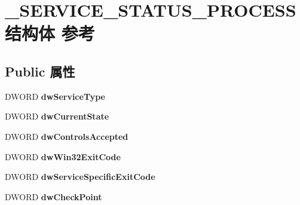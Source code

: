 \hypertarget{struct___s_e_r_v_i_c_e___s_t_a_t_u_s___p_r_o_c_e_s_s}{}\section{\+\_\+\+S\+E\+R\+V\+I\+C\+E\+\_\+\+S\+T\+A\+T\+U\+S\+\_\+\+P\+R\+O\+C\+E\+S\+S结构体 参考}
\label{struct___s_e_r_v_i_c_e___s_t_a_t_u_s___p_r_o_c_e_s_s}
\subsection*{Public 属性}
\begin{DoxyCompactItemize}
\item 
\mbox{\label{struct___s_e_r_v_i_c_e___s_t_a_t_u_s___p_r_o_c_e_s_s_a4f7622b652561e6fab563b5cab7ea99b}} 
D\+W\+O\+RD {\bfseries dw\+Service\+Type}
\item 
\mbox{\label{struct___s_e_r_v_i_c_e___s_t_a_t_u_s___p_r_o_c_e_s_s_aad5734dd9b87043e4e08a543c2dc3015}} 
D\+W\+O\+RD {\bfseries dw\+Current\+State}
\item 
\mbox{\label{struct___s_e_r_v_i_c_e___s_t_a_t_u_s___p_r_o_c_e_s_s_ac13b0a834f89f1159f95b05c8e6c1b2b}} 
D\+W\+O\+RD {\bfseries dw\+Controls\+Accepted}
\item 
\mbox{\label{struct___s_e_r_v_i_c_e___s_t_a_t_u_s___p_r_o_c_e_s_s_a0c445ba178d6ea418e1a3e664619683c}} 
D\+W\+O\+RD {\bfseries dw\+Win32\+Exit\+Code}
\item 
\mbox{\label{struct___s_e_r_v_i_c_e___s_t_a_t_u_s___p_r_o_c_e_s_s_a2176b63f87da6764ce027938f95070fd}} 
D\+W\+O\+RD {\bfseries dw\+Service\+Specific\+Exit\+Code}
\item 
\mbox{\label{struct___s_e_r_v_i_c_e___s_t_a_t_u_s___p_r_o_c_e_s_s_a08b0b301a0a215258471ea0c9971508f}} 
D\+W\+O\+RD {\bfseries dw\+Check\+Point}
\item 

\end{DoxyCompactItemize}

